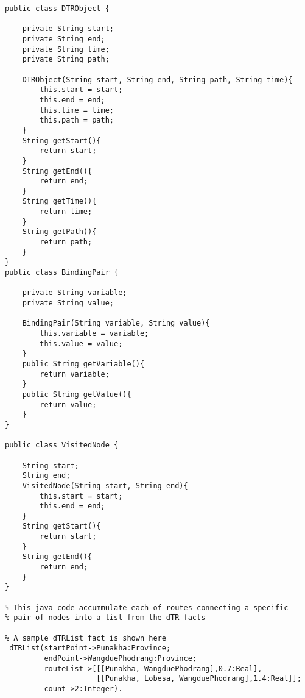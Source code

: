 \footnotesize
\begin{verbatim}
public class DTRObject {

	private String start;
	private String end;
	private String time;
	private String path;
	
	DTRObject(String start, String end, String path, String time){
		this.start = start;
		this.end = end;
		this.time = time;
		this.path = path;
	}
	String getStart(){
		return start;
	}
	String getEnd(){
		return end;
	}
	String getTime(){
		return time;
	}
	String getPath(){
		return path;
	}
}
public class BindingPair {

	private String variable;
	private String value;
	
	BindingPair(String variable, String value){
		this.variable = variable;
		this.value = value;
	}
	public String getVariable(){
		return variable;
	}
	public String getValue(){
		return value;
	}
}

public class VisitedNode {

	String start;
	String end;
	VisitedNode(String start, String end){
		this.start = start;
		this.end = end;
	}
	String getStart(){
		return start;
	}
	String getEnd(){
		return end;
	}
}

% This java code accummulate each of routes connecting a specific
% pair of nodes into a list from the dTR facts

% A sample dTRList fact is shown here
 dTRList(startPoint->Punakha:Province; 
         endPoint->WangduePhodrang:Province; 
         routeList->[[[Punakha, WangduePhodrang],0.7:Real],
                     [[Punakha, Lobesa, WangduePhodrang],1.4:Real]]; 
         count->2:Integer).
\end{verbatim}
\footnotesize
